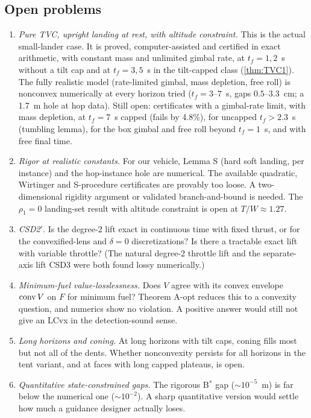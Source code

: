 \subsection{Open problems}
\begin{enumerate}[leftmargin=*,itemsep=3pt]
\item \emph{Pure TVC, upright landing at rest, with altitude constraint.} This is the actual small-lander case. It is proved, computer-assisted and
certified in exact arithmetic, with constant mass and unlimited gimbal rate, at $t_f=1,2$~s without a tilt cap and at $t_f=3,5$~s in
the tilt-capped class (\cref{thm:TVC1}). The fully realistic model (rate-limited gimbal, mass depletion, free roll) is nonconvex
numerically at every horizon tried ($t_f=3$--$7$~s, gaps $0.5$--$3.3$~cm; a 1.7~m hole at hop data). Still open: certificates with a
gimbal-rate limit, with mass depletion, at $t_f=7$~s capped (fails by 4.8\%), for uncapped $t_f>2.3$~s (tumbling lemma), for the box
gimbal and free roll beyond $t_f=1$~s, and with free final time.
\item \emph{Rigor at realistic constants.} For our vehicle, Lemma S (hard soft landing, per instance) and the hop-instance hole
are numerical. The available quadratic, Wirtinger and S-procedure certificates are provably too loose. A two-dimensional
rigidity argument or validated branch-and-bound is needed. The $\rho_1=0$ landing-set result with altitude constraint is open at
$T/W\approx1.27$.
\item \emph{CSD2$'$.} Is the degree-2 lift exact in continuous time with fixed thrust, or for the convexified-lens and $\delta=0$
discretizations? Is there a tractable exact lift with variable throttle? (The natural degree-2 throttle lift and the separate-axis
lift CSD3 were both found lossy numerically.)
\item \emph{Minimum-fuel value-losslessness.} Does $V$ agree with its convex envelope $\operatorname{conv} V$ on $F$ for minimum fuel? Theorem A-opt reduces this to a convexity
question, and numerics show no violation. A positive answer would still not give an LCvx in the detection-sound sense.
\item \emph{Long horizons and coning.} At long horizons with tilt caps, coning fills most but not all of the dents. Whether
nonconvexity persists for all horizons in the tent variant, and at faces with long capped plateaus, is open.
\item \emph{Quantitative state-constrained gaps.} The rigorous B$^*$ gap ($\sim10^{-5}$~m) is far below the numerical one
($\sim10^{-2}$). A sharp quantitative version would settle how much a guidance designer actually loses.

\end{enumerate}
